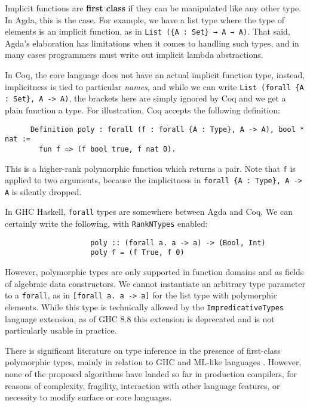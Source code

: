 \documentclass[acmsmall,review,anonymous]{acmart}\settopmatter{printfolios=true,printccs=false,printacmref=false}
\begin{document}
Implicit functions are \textbf{first class} if they can be manipulated like any
other type. In Agda, this is the case. For example, we have a list type where
the type of elements is an implicit function, as in \texttt{List (\{A : Set\} →
  A → A)}. That said, Agda's elaboration has limitations when it comes to
handling such types, and in many cases programmers must write out
implicit lambda abstractions.

In Coq, the core language does not have an actual implicit function type,
instead, implicitness is tied to particular \emph{names}, and while we can write
\texttt{List (forall \{A : Set\}, A -> A)}, the brackets here are simply ignored
by Coq and we get a plain function a type. For illustration, Coq accepts the
following definition:
\begin{verbatim}
      Definition poly : forall (f : forall {A : Type}, A -> A), bool * nat :=
        fun f => (f bool true, f nat 0).
\end{verbatim}
This is a higher-rank polymorphic function which returns a pair. Note that
\texttt{f} is applied to two arguments, because the implicitness in
\texttt{forall \{A : Type\}, A -> A} is silently dropped.

In GHC Haskell, \texttt{forall} types are somewhere between Agda and Coq. We can certainly write the following, with \texttt{RankNTypes} enabled:
\begin{verbatim}
                    poly :: (forall a. a -> a) -> (Bool, Int)
                    poly f = (f True, f 0)
\end{verbatim}
However, polymorphic types are only supported in function domains and as fields
of algebraic data constructors. We cannot instantiate an arbitrary type
parameter to a \texttt{forall}, as in \texttt{[forall a. a -> a]} for the list
type with polymorphic elements. While this type is technically allowed by the
\texttt{ImpredicativeTypes} language extension, as of GHC 8.8 this extension is
deprecated and is not particularly usable in practice.

There is significant literature on type inference in the presence of first-class
polymorphic types, mainly in relation to GHC and ML-like languages
\cite{TODO}. However, none of the proposed algorithms have landed so far in
production compilers, for reasons of complexity, fragility, interaction with
other language features, or necessity to modify surface or core languages.
\end{document}
